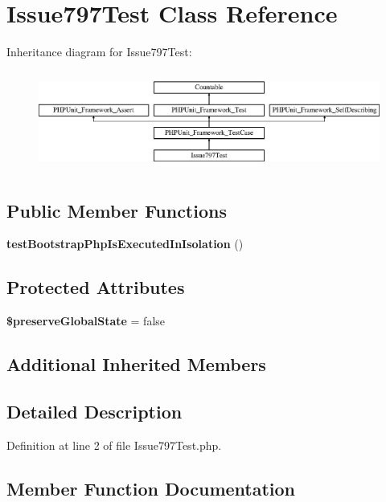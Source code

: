 \section{Issue797\+Test Class Reference}
\label{class_issue797_test}
Inheritance diagram for Issue797\+Test\+:\begin{figure}[H]
\begin{center}
\leavevmode
\includegraphics[height=3.303835cm]{class_issue797_test}
\end{center}
\end{figure}
\subsection*{Public Member Functions}
\begin{DoxyCompactItemize}
\item 
{\bf test\+Bootstrap\+Php\+Is\+Executed\+In\+Isolation} ()
\end{DoxyCompactItemize}
\subsection*{Protected Attributes}
\begin{DoxyCompactItemize}
\item 
{\bf \$preserve\+Global\+State} = false
\end{DoxyCompactItemize}
\subsection*{Additional Inherited Members}


\subsection{Detailed Description}


Definition at line 2 of file Issue797\+Test.\+php.



\subsection{Member Function Documentation}
